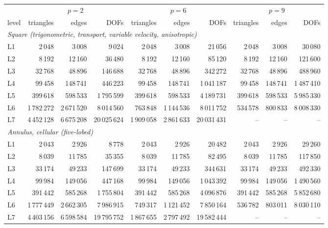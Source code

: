 \begin{tabular}{lrrrrrrrrr}
\toprule
 & \multicolumn{3}{c}{$p=2$} & \multicolumn{3}{c}{$p=6$} & \multicolumn{3}{c}{$p=9$}\\
\cmidrule(lr){2-4}\cmidrule(lr){5-7}\cmidrule(lr){8-10}
level & triangles & edges & DOFs & triangles & edges & DOFs & triangles & edges & DOFs\\
\midrule
\multicolumn{10}{l}{\emph{Square (trigonometric, transport, variable velocity, anisotropic)}}\\
L1 & 2\,048 & 3\,008 & 9\,024 & 2\,048 & 3\,008 & 21\,056 & 2\,048 & 3\,008 & 30\,080\\
L2 & 8\,192 & 12\,160 & 36\,480 & 8\,192 & 12\,160 & 85\,120 & 8\,192 & 12\,160 & 121\,600\\
L3 & 32\,768 & 48\,896 & 146\,688 & 32\,768 & 48\,896 & 342\,272 & 32\,768 & 48\,896 & 488\,960\\
L4 & 99\,458 & 148\,741 & 446\,223 & 99\,458 & 148\,741 & 1\,041\,187 & 99\,458 & 148\,741 & 1\,487\,410\\
L5 & 399\,618 & 598\,533 & 1\,795\,599 & 399\,618 & 598\,533 & 4\,189\,731 & 399\,618 & 598\,533 & 5\,985\,330\\
L6 & 1\,782\,272 & 2\,671\,520 & 8\,014\,560 & 763\,848 & 1\,144\,536 & 8\,011\,752 & 534\,578 & 800\,833 & 8\,008\,330\\
L7 & 4\,452\,128 & 6\,675\,208 & 20\,025\,624 & 1\,909\,058 & 2\,861\,633 & 20\,031\,431 & -- & -- & --\\
\midrule
\multicolumn{10}{l}{\emph{Annulus, cellular (five-lobed)}}\\
L1 & 2\,043 & 2\,926 & 8\,778 & 2\,043 & 2\,926 & 20\,482 & 2\,043 & 2\,926 & 29\,260\\
L2 & 8\,039 & 11\,785 & 35\,355 & 8\,039 & 11\,785 & 82\,495 & 8\,039 & 11\,785 & 117\,850\\
L3 & 33\,174 & 49\,233 & 147\,699 & 33\,174 & 49\,233 & 344\,631 & 33\,174 & 49\,233 & 492\,330\\
L4 & 99\,984 & 149\,056 & 447\,168 & 99\,984 & 149\,056 & 1\,043\,392 & 99\,984 & 149\,056 & 1\,490\,560\\
L5 & 391\,442 & 585\,268 & 1\,755\,804 & 391\,442 & 585\,268 & 4\,096\,876 & 391\,442 & 585\,268 & 5\,852\,680\\
L6 & 1\,777\,449 & 2\,662\,305 & 7\,986\,915 & 749\,317 & 1\,121\,452 & 7\,850\,164 & 536\,782 & 803\,011 & 8\,030\,110\\
L7 & 4\,403\,156 & 6\,598\,584 & 19\,795\,752 & 1\,867\,655 & 2\,797\,492 & 19\,582\,444 & -- & -- & --\\

\end{tabular}

